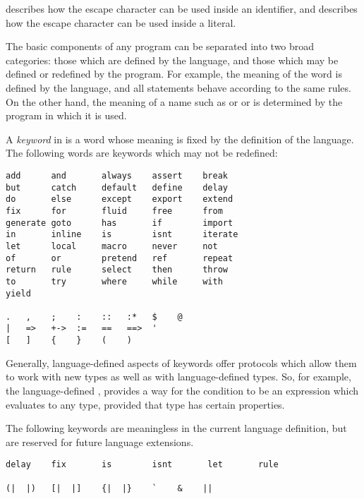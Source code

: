  describes how the escape character can be used
inside an identifier, and  describes
how the escape character can be used inside a literal.


The basic components of any \asharp{} program can be separated into
two broad categories:  those which are defined by the language, and
those which may be defined or redefined by the program.
For example, the meaning of the word  is defined by the
language, and all  statements behave according to
the same rules.
On the other hand, the meaning of a name such as  or 
or \ttin{+} is determined by the program in which it is used.

A {\em keyword\/} in \asharp{} is a word whose meaning is fixed by the
definition of the language.  The following words are keywords which
may not be redefined:

\begin{verbatim}
add      and       always    assert    break
but      catch     default   define    delay
do       else      except    export    extend 
fix      for       fluid     free      from     
generate goto      has       if        import
in       inline    is        isnt      iterate
let      local     macro     never     not 
of       or        pretend   ref       repeat
return   rule      select    then      throw
to       try       where     while     with
yield

.   ,    ;    :    ::   :*   $    @
|   =>   +->  :=   ==   ==>  '
[   ]    {    }    (    )    
\end{verbatim}

Generally, language-defined aspects of keywords offer protocols
which allow them
to work with new types as well as with language-defined types.  
So, for example, the language-defined , provides a way for
the condition to be an expression which evaluates to any type, provided
that type has certain properties.

The following keywords are meaningless in the current language
definition, but are reserved for future language extensions.

\begin{verbatim}
delay    fix       is        isnt       let       rule      

(|  |)   [|  |]    {|  |}    `    &    ||
\end{verbatim}

